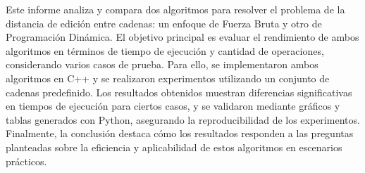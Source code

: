 Este informe analiza y compara dos algoritmos para resolver el problema de la distancia de edición entre cadenas: un enfoque de Fuerza Bruta y otro de Programación Dinámica. El objetivo principal es evaluar el rendimiento de ambos algoritmos en términos de tiempo de ejecución y cantidad de operaciones, considerando varios casos de prueba. Para ello, se implementaron ambos algoritmos en C++ y se realizaron experimentos utilizando un conjunto de cadenas predefinido. Los resultados obtenidos muestran diferencias significativas en tiempos de ejecución para ciertos casos, y se validaron mediante gráficos y tablas generados con Python, asegurando la reproducibilidad de los experimentos. Finalmente, la conclusión destaca cómo los resultados responden a las preguntas planteadas sobre la eficiencia y aplicabilidad de estos algoritmos en escenarios prácticos.